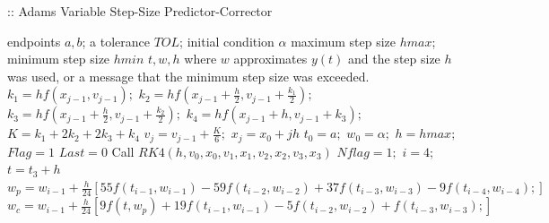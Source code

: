 \documentclass[12pt,oneside]{book}
\begin{document}
\begin{spacing}{1.2}
				\begin{algorithm}[H]
					\caption{:: Adams Variable Step-Size Predictor-Corrector}
					\begin{algorithmic}[1]
						\REQUIRE endpoints $ a, b $; \hspace*{0.2cm} a tolerance $ TOL $; \hspace*{0.2cm} initial condition $ \alpha $ \hspace*{0.2cm} maximum step size $ hmax $; \hspace*{0.2cm} minimum step size $ hmin $
						\ENSURE $ t, w, h $ where $ w $ approximates $ y(t) $ and the step size $ h $ was used, or a message that the minimum step size was exceeded.
						\STATE {}
							\STATE $ k_{1} = hf(x_{j-1}, v_{j-1}); $
							\STATE $ k_{2} = hf(x_{j-1} + \frac{h}{2}, v_{j-1} + \frac{k_{1}}{2}); $
							\STATE $ k_{3} = hf(x_{j-1} + \frac{h}{2}, v_{j-1} + \frac{k_{2}}{2}); $
							\STATE $ k_{4} = hf(x_{j-1} + h, v_{j-1} + k_{3}); $
							\STATE $ K = k_{1} + 2k_{2} + 2k_{3} + k_{4} $
							\STATE $ v_{j} = v_{j-1} + \frac{K}{6}; $
							\STATE $ x_{j} = x_{0} + jh $
						\ENDFOR
						\STATE $ t_{0} = a; $
						\STATE $ w_{0} = \alpha; $
						\STATE $ h = hmax; $
						\STATE $ Flag = 1 $ \hspace*{0.5cm} 
						\STATE $ Last = 0 $ \hspace*{0.5cm} 
						\STATE Call $ RK4(h, v_{0}, x_{0}, v_{1}, x_{1}, v_{2}, x_{2}, v_{3}, x_{3}) $
						\STATE $ Nflag = 1; $ \hspace*{0.5cm} 
						\STATE $ i = 4; $
						\STATE $ t = t_{3} + h $
							\STATE $ w_{p} = w_{i-1} + \frac{h}{24} [ 55f(t_{i-1}, w_{i-1}) - 59f(t_{i-2}, w_{i-2}) + 37f(t_{i-3}, w_{i-3}) - 9f(t_{i-4}, w_{i-4}); ] $ \hspace*{0.5cm} 
							\STATE $ w_{c} = w_{i-1} + \frac{h}{24} [ 9f(t, w_{p}) + 19f(t_{i-1}, w_{i-1}) - 5f(t_{i-2}, w_{i-2}) + f(t_{i-3}, w_{i-3}); ] $ \hspace*{0.5cm} 

\end{algorithmic}
\end{algorithm}
\end{spacing}
\end{document}
